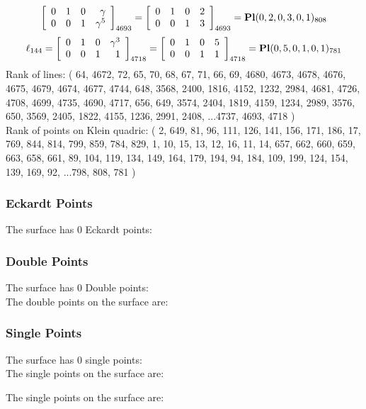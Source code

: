 \documentclass{article}
\begin{document}
{$$\left[
\begin{array}{*{4}{r}}
0 & 1 & 0 & \gamma \\
0 & 0 & 1 & \gamma^{5}\\
\end{array}
\right]
_{4693}
=
\left[
\begin{array}{*{4}c}
0  & 1  & 0  & 2\\
0  & 0  & 1  & 3\\
\end{array}
\right]_{4693}
={\rm\bf Pl}(0,2,0,3,0,1 )_{808}$$
$$
\ell_{144} = 
\left[
\begin{array}{*{4}{r}}
0 & 1 & 0 & \gamma^{3}\\
0 & 0 & 1 & 1\\
\end{array}
\right]
_{4718}
=
\left[
\begin{array}{*{4}c}
0  & 1  & 0  & 5\\
0  & 0  & 1  & 1\\
\end{array}
\right]_{4718}
={\rm\bf Pl}(0,5,0,1,0,1 )_{781}$$
Rank of lines: ( 64, 4672, 72, 65, 70, 68, 67, 71, 66, 69, 4680, 4673, 4678, 4676, 4675, 4679, 4674, 4677, 4744, 648, 3568, 2400, 1816, 4152, 1232, 2984, 4681, 4726, 4708, 4699, 4735, 4690, 4717, 656, 649, 3574, 2404, 1819, 4159, 1234, 2989, 3576, 650, 3569, 2405, 1822, 4155, 1236, 2991, 2408, ...4737, 4693, 4718 )\\
Rank of points on Klein quadric: ( 2, 649, 81, 96, 111, 126, 141, 156, 171, 186, 17, 769, 844, 814, 799, 859, 784, 829, 1, 10, 15, 13, 12, 16, 11, 14, 657, 662, 660, 659, 663, 658, 661, 89, 104, 119, 134, 149, 164, 179, 194, 94, 184, 109, 199, 124, 154, 139, 169, 92, ...798, 808, 781 )\\
\subsubsection*{Eckardt Points}
The surface has 0 Eckardt points:\\
\subsubsection*{Double Points}
The surface has 0 Double points:\\
The double points on the surface are:\\
\begin{multicols}{2}
\noindent
\end{multicols}
\subsubsection*{Single Points}
The surface has 0 single points:\\
The single points on the surface are:\\
\begin{multicols}{2}
\noindent
\end{multicols}
The single points on the surface are:\\
}
\end{document}
